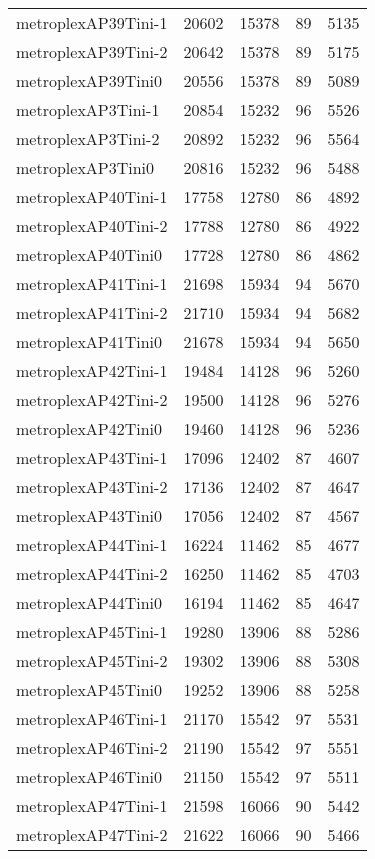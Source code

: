 \begin{tabular}{lrrrr}
metroplexAP39Tini-1 & 20602 & 15378 & 89 & 5135 \\
metroplexAP39Tini-2 & 20642 & 15378 & 89 & 5175 \\
metroplexAP39Tini0 & 20556 & 15378 & 89 & 5089 \\
metroplexAP3Tini-1 & 20854 & 15232 & 96 & 5526 \\
metroplexAP3Tini-2 & 20892 & 15232 & 96 & 5564 \\
metroplexAP3Tini0 & 20816 & 15232 & 96 & 5488 \\
metroplexAP40Tini-1 & 17758 & 12780 & 86 & 4892 \\
metroplexAP40Tini-2 & 17788 & 12780 & 86 & 4922 \\
metroplexAP40Tini0 & 17728 & 12780 & 86 & 4862 \\
metroplexAP41Tini-1 & 21698 & 15934 & 94 & 5670 \\
metroplexAP41Tini-2 & 21710 & 15934 & 94 & 5682 \\
metroplexAP41Tini0 & 21678 & 15934 & 94 & 5650 \\
metroplexAP42Tini-1 & 19484 & 14128 & 96 & 5260 \\
metroplexAP42Tini-2 & 19500 & 14128 & 96 & 5276 \\
metroplexAP42Tini0 & 19460 & 14128 & 96 & 5236 \\
metroplexAP43Tini-1 & 17096 & 12402 & 87 & 4607 \\
metroplexAP43Tini-2 & 17136 & 12402 & 87 & 4647 \\
metroplexAP43Tini0 & 17056 & 12402 & 87 & 4567 \\
metroplexAP44Tini-1 & 16224 & 11462 & 85 & 4677 \\
metroplexAP44Tini-2 & 16250 & 11462 & 85 & 4703 \\
metroplexAP44Tini0 & 16194 & 11462 & 85 & 4647 \\
metroplexAP45Tini-1 & 19280 & 13906 & 88 & 5286 \\
metroplexAP45Tini-2 & 19302 & 13906 & 88 & 5308 \\
metroplexAP45Tini0 & 19252 & 13906 & 88 & 5258 \\
metroplexAP46Tini-1 & 21170 & 15542 & 97 & 5531 \\
metroplexAP46Tini-2 & 21190 & 15542 & 97 & 5551 \\
metroplexAP46Tini0 & 21150 & 15542 & 97 & 5511 \\
metroplexAP47Tini-1 & 21598 & 16066 & 90 & 5442 \\
metroplexAP47Tini-2 & 21622 & 16066 & 90 & 5466 \\

\end{tabular}
